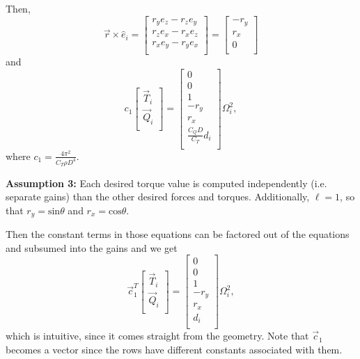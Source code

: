 \documentclass{article}
\begin{document}
\vspace{10pt}
Then, 
\[
\vec{r} \times \hat{e}_i
=
\begin{bmatrix}
    r_y e_z - r_z e_y \\
    r_z e_x - r_x e_z \\
    r_x e_y - r_y e_x \\
\end{bmatrix}
=
\begin{bmatrix}
    -r_y \\
    r_x \\
    0 \\ 
\end{bmatrix}
\]
and 
\[
c_1 
\begin{bmatrix}
    \Vec{T}_i \\ \Vec{Q}_i \\
\end{bmatrix}
=
\begin{bmatrix}
    0 \\ 
    0 \\
    1 \\ 
    -r_y \\
    r_x \\
    \frac{C_Q D}{C_T} d_i \\
\end{bmatrix}
\Omega_i^2,
\]
where $c_1 = \frac{4 \pi^2}{C_T \rho D^4}$.

\vspace{10pt}
\noindent
\textbf{Assumption 3:} Each desired torque value is computed independently (i.e. separate gains) than the other desired forces and torques.
Additionally, $\ell=1$, so that $r_y = \text{sin}\theta$ and $r_x = \text{cos}\theta$.

\vspace{10pt}
\noindent
Then the constant terms in those equations can be factored out of the equations and subsumed into the gains and we get
\[
\vec{c}_1^T
\begin{bmatrix}
    \Vec{T}_i \\ \Vec{Q}_i \\
\end{bmatrix}
=
\begin{bmatrix}
    0 \\ 
    0 \\
    1 \\ 
    -r_y \\
    r_x \\
    d_i \\
\end{bmatrix}
\Omega_i^2,
\]
which is intuitive, since it comes straight from the geometry.
Note that $\vec{c}_1$ becomes a vector since the rows have different constants associated with them.
\end{document}
